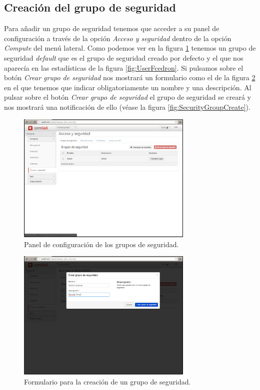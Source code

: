 \documentclass{article}
\begin{document}
\clearpage
\subsection{Creación del grupo de seguridad}
	Para añadir un grupo de seguridad tenemos que acceder a su panel de configuración a través de la opción \emph{Acceso y seguridad} dentro de la opción \emph{Compute} del menú lateral. Como podemos ver en la figura \ref{fig:SecurityGroupInit} tenemos un grupo de seguridad \emph{default} que es el grupo de seguridad creado por defecto y el que nos aparecía en las estadísticas de la figura \ref{fig:UserFcedron}. Si pulsamos sobre el botón \emph{Crear grupo de seguridad} nos mostrará un formulario como el de la figura \ref{fig:SecurityGroupFormCreate} en el que tenemos que indicar obligatoriamente un nombre y una descripción. Al pulsar sobre el botón \emph{Crear grupo de seguridad} el grupo de seguridad se creará y nos mostrará una notificación de ello (véase la figura \ref{fig:SecurityGroupCreate}).

\begin{figure}[h]
  \centering
    \includegraphics[width=0.75\textwidth]{img/m_027.png}
  \caption{Panel de configuración de los grupos de seguridad.}
  \label{fig:SecurityGroupInit}
\end{figure}	

\begin{figure}[h]
  \centering
    \includegraphics[width=0.75\textwidth]{img/m_028.png}
  \caption{Formulario para la creación de un grupo de seguridad.}
  \label{fig:SecurityGroupFormCreate}
\end{figure}	
\end{document}
